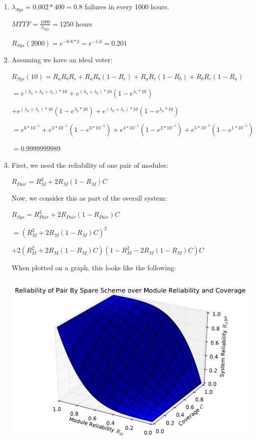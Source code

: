 \documentclass[a4paper,12pt]{article}
\begin{document}
\begin{enumerate}
        \item $\lambda_{Sys} = 0.002 * 400 = 0.8$ failures in every 1000 hours.

        $MTTF = \frac{1000}{\lambda_{Sys}} = 1250$ hours

        $R_{Sys}(2000) = e^{-0.8 * 2} = e^{-1.6} = 0.201$

        \item Assuming we have an ideal voter:

        $R_{Sys}(10) = R_aR_bR_c + R_aR_b(1 - R_c) + R_aR_c(1 - R_b) + R_bR_c(1 - R_a)$

        $= e^{(\lambda_a + \lambda_b + \lambda_c)*10} + e^{(\lambda_a + \lambda_b)*10}(1 - e^{\lambda_c*10})$

        $+ e^{(\lambda_a + \lambda_c)*10}(1 - e^{\lambda_b*10}) + e^{(\lambda_b + \lambda_c)*10}(1 - e^{\lambda_a*10})$

        $= e^{6*10^{-5}} + e^{3*10^{-5}}(1 - e^{3*10^{-5}}) + e^{4*10^{-5}}(1 - e^{2*10^{-5}}) + e^{5*10^{-5}}(1 - e^{1*10^{-5}})$

        $ = 0.9999999989$

        \item First, we need the reliability of one pair of modules:

        $R_{Pair} = R_M^2 + 2R_M(1 - R_M)C$

        Now, we consider this as part of the overall system:

        $R_{Sys} = R_{Pair}^2 + 2R_{Pair}(1 - R_{Pair})C$

        $= (R_M^2 + 2R_M(1 - R_M)C)^2$

        $+ 2(R_M^2 + 2R_M(1 - R_M)C)(1 - R_M^2 - 2R_M(1 - R_M)C)C$

        When plotted on a graph, this looks like the following:

        \begin{center}
            \includegraphics[scale=0.7]{question_6_graph}
        \end{center}


\end{enumerate}
\end{document}
